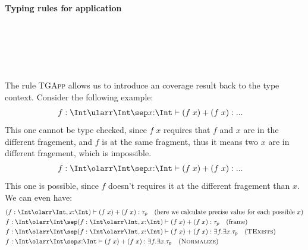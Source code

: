 \paragraph{Typing rules for application}

\begin{figure}[!ht]
     \\[.8em]
    \\[.8em]
    \\[.8em]
    \\[.8em]
\end{figure}

The rule \textsc{TGApp} allows us to introduce an coverage result back to the type context. Consider the following example:
\begin{align*}
    &f:\Int \ularr \Int \sep x{:}\Int  \vdash (f\;x) + (f\;x) : ... 
\end{align*}\noindent
This one cannot be type checked, since $f\;x$ requires that $f$ and $x$ are in the different fragement, and $f$ is at the same fragment, thus it means two $x$ are in different fragement, which is impossible.
\begin{align*}
    &f:\Int \olarr \Int \sep x{:}\Int  \vdash (f\;x) + (f\;x) : ... 
\end{align*}\noindent
This one is possible, since $f$ doesn't requires it at the different fragement than $x$. We can even have:
\begin{align*}
    &(f:\Int \olarr \Int, x{:}\Int)  \vdash (f\;x) + (f\;x) : \tau_p \quad (\text{here we calculate precise value for each possible $x$}) \\
    &f:\Int \olarr \Int \sep (f:\Int \olarr \Int, x{:}\Int)  \vdash (f\;x) + (f\;x) : \tau_p \quad (\text{frame}) \\
    &f:\Int \olarr \Int \sep (f:\Int \olarr \Int, x{:}\Int) \vdash (f\;x) + (f\;x) : \exists f. \exists x. \tau_p \quad (\textsc{TExists}) \\
    &f:\Int \olarr \Int \sep x{:}\Int \vdash (f\;x) + (f\;x) : \exists f. \exists x. \tau_p \quad (\textsc{Normalize}) \\
\end{align*}\noindent

